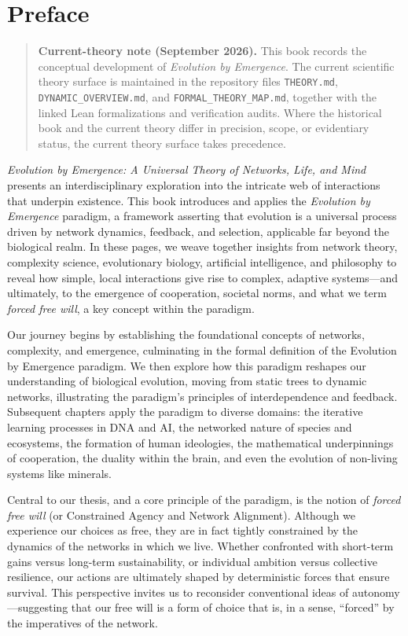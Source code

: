 \chapter*{Preface}


\begin{quote}
\textbf{Current-theory note (September 2026).}
This book records the conceptual development of \emph{Evolution by Emergence}.
The current scientific theory surface is maintained in the repository files
\texttt{THEORY.md}, \texttt{DYNAMIC\_OVERVIEW.md}, and
\texttt{FORMAL\_THEORY\_MAP.md}, together with the linked Lean formalizations
and verification audits. Where the historical book and the current theory
differ in precision, scope, or evidentiary status, the current theory surface
takes precedence.
\end{quote}

\textit{Evolution by Emergence: A Universal Theory of Networks, Life, and Mind} presents an interdisciplinary exploration into the intricate web of interactions that underpin existence. This book introduces and applies the \emph{Evolution by Emergence} paradigm, a framework asserting that evolution is a universal process driven by network dynamics, feedback, and selection, applicable far beyond the biological realm. In these pages, we weave together insights from network theory, complexity science, evolutionary biology, artificial intelligence, and philosophy to reveal how simple, local interactions give rise to complex, adaptive systems—and ultimately, to the emergence of cooperation, societal norms, and what we term \emph{forced free will}, a key concept within the paradigm. %


Our journey begins by establishing the foundational concepts of networks, complexity, and emergence, culminating in the formal definition of the Evolution by Emergence paradigm. We then explore how this paradigm reshapes our understanding of biological evolution, moving from static trees to dynamic networks, illustrating the paradigm's principles of interdependence and feedback. Subsequent chapters apply the paradigm to diverse domains: the iterative learning processes in DNA and AI, the networked nature of species and ecosystems, the formation of human ideologies, the mathematical underpinnings of cooperation, the duality within the brain, and even the evolution of non-living systems like minerals. %

Central to our thesis, and a core principle of the paradigm, is the notion of \emph{forced free will} (or Constrained Agency and Network Alignment). Although we experience our choices as free, they are in fact tightly constrained by the dynamics of the networks in which we live. Whether confronted with short-term gains versus long-term sustainability, or individual ambition versus collective resilience, our actions are ultimately shaped by deterministic forces that ensure survival. This perspective invites us to reconsider conventional ideas of autonomy—suggesting that our free will is a form of choice that is, in a sense, “forced” by the imperatives of the network.

